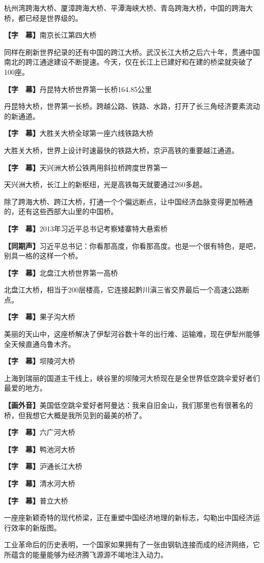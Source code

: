 \documentclass{ctexart}
\newcommand{\zkh}[1]{\textbf{\hspace{-2.7em} 【#1】}}
\begin{document}
 
杭州湾跨海大桥、厦漳跨海大桥、平潭海峡大桥、青岛跨海大桥，中国的跨海大桥，都已经是世界级的。

 \zkh{字　幕}南京长江第四大桥

 
同样在刷新世界纪录的还有中国的跨江大桥。武汉长江大桥之后六十年，贯通中国南北的跨江通途建设不断提速。今天，仅在长江上已建好和在建的桥梁就突破了100座。

 \zkh{字　幕}丹昆特大桥世界第一长桥164.85公里

 
丹昆特大桥，世界第一长桥。跨越公路、铁路、水路，打开了长三角经济要素流动的新通道。

 \zkh{字　幕}大胜关大桥全球第一座六线铁路大桥

 
大胜关大桥，世界上设计时速最快的铁路大桥，京沪高铁的重要越江通道。

 \zkh{字　幕}天兴洲大桥公铁两用斜拉桥跨度世界第一

 天兴洲大桥，长江上的新枢纽，光是高铁每天就要通过260多趟。

除了跨海大桥、跨江大桥，打通一个个偏远断点，让中国经济血脉变得更加畅通的，还有这些西部大山里的中国桥。

 \zkh{字　幕}2013年习近平总书记考察矮寨特大悬索桥

\zkh{同期声}习近平总书记：你看那高度，你看那高度。也是一个很有特色，是吧，别具一格的这样一个桥。

 \zkh{字　幕}北盘江大桥世界第一高桥

 
北盘江大桥，相当于200层楼高，它连接起黔川滇三省交界最后一个高速公路断点。

 \zkh{字　幕}果子沟大桥

 
美丽的天山中，这座桥解决了伊犁河谷数十年的出行难、运输难，现在伊犁州能够全天候直通乌鲁木齐。

 \zkh{字　幕}坝陵河大桥

 
上海到瑞丽的国道主干线上，峡谷里的坝陵河大桥现在是全世界低空跳伞爱好者们最爱的地方。

\zkh{画外音}美国低空跳伞爱好者阿曼达：我来自旧金山，我们那里也有很著名的桥，但我想它大概是我所见到的最美的桥了。

 \zkh{字　幕}六广河大桥

 \zkh{字　幕}鸭池河大桥

 \zkh{字　幕}沪通长江大桥

 \zkh{字　幕}清水河大桥

 \zkh{字　幕}普立大桥

 
一座座新颖奇特的现代桥梁，正在重塑中国经济地理的新标志，勾勒出中国经济运行效率的新版图。

 
工业革命后的历史表明，一个国家如果拥有了一张由钢轨连接而成的经济网络，它所蕴含的能量能够为经济腾飞源源不竭地注入动力。
\end{document}
